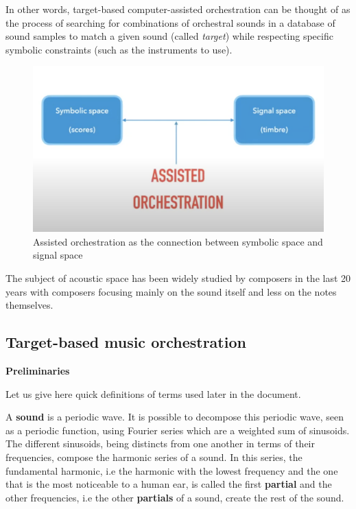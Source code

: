 \documentclass[a4paper]{book}
\newcommand{\alex}[2]{\textcolor{red}{#1}}
\begin{document}
In other words, target-based computer-assisted orchestration can be thought of as the process of searching for combinations of orchestral sounds in a database of sound samples to match a given sound (called \emph{target}) while respecting specific symbolic constraints (such as the instruments to use).
\begin{figure}[h!]
\centering
\includegraphics[scale=0.4]{assistedorch.png}
\caption{Assisted orchestration as the connection between symbolic space and signal space}
\label{figassistedorch}
\end{figure}

The subject of acoustic space has been widely studied by composers in the last 20 years with composers focusing mainly on the sound itself and less on the notes themselves.  \\
\subsection{Target-based music orchestration}

\textbf{Preliminaries}


Let us give here quick definitions of terms used later in the document. 

A \textbf{sound} is a periodic wave. It is possible to decompose this periodic wave, seen as a periodic function, using Fourier series which are a weighted sum of sinusoids.\\

The different sinusoids, being distincts from one another in terms of their frequencies, compose the harmonic series of a sound. In this series, the fundamental harmonic, i.e the harmonic with the lowest frequency and the one that is the most noticeable to a human ear, is called the first \textbf{partial} and the other frequencies, i.e the other \textbf{partials} of a sound, create the rest of the sound.\\
\end{document}
